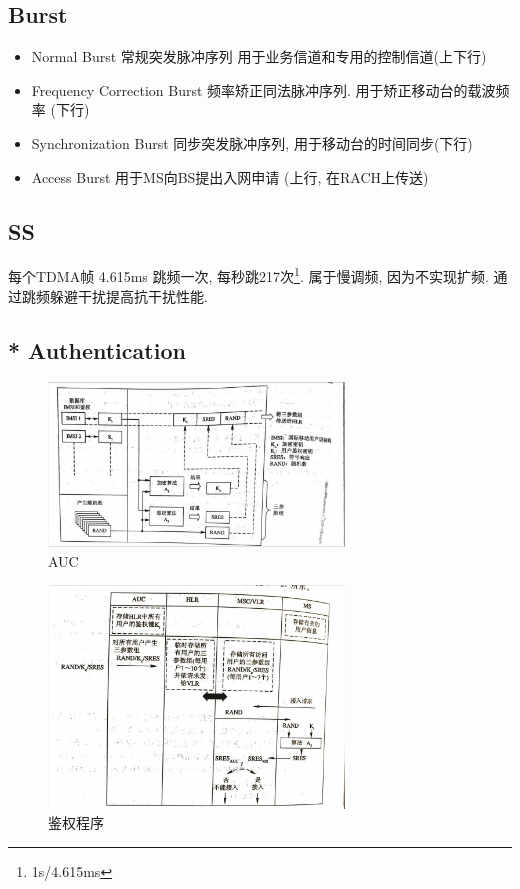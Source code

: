 \documentclass[a4paper]{report}
\begin{document}
\subsection{Burst}
\begin{itemize}
	\item Normal Burst 常规突发脉冲序列 用于业务信道和专用的控制信道(上下行)
	\item Frequency Correction Burst 频率矫正同法脉冲序列. 用于矫正移动台的载波频率 (下行)
	\item Synchronization Burst 同步突发脉冲序列, 用于移动台的时间同步(下行)
	\item Access Burst 用于MS向BS提出入网申请 (上行, 在RACH上传送)
\end{itemize}

\subsection{SS}
每个TDMA帧 4.615ms 跳频一次, 每秒跳217次\footnote{1s/4.615ms}. 属于慢调频, 因为不实现扩频. 通过跳频躲避干扰提高抗干扰性能. 

\subsection{* Authentication}
\begin{figure}[H]
\centering
\includegraphics[width=0.7\textwidth]{gsm_auc.jpg}
\caption{AUC}
\end{figure}

\begin{figure}[H]
\centering
\includegraphics[width=0.7\textwidth]{gsm_auc_flow.jpg}
\caption{鉴权程序}
\end{figure}
\end{document}
